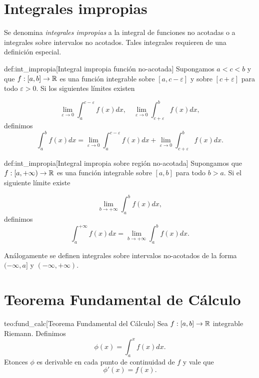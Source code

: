 \section{Integrales impropias}
Se denomina \emph{integrales impropias} a la integral de funciones no acotadas o a integrales sobre intervalos no acotados. Tales integrales requieren de una definición especial.
\begin{definicion}{def:int_impropia}[Integral impropia función no-acotada] Supongamos $a<c<b$ y que $f:[a,b]\to\mathbb{R}$ es una función integrable sobre $[a,c-\varepsilon]$ y sobre $[c+\varepsilon]$ para todo $\varepsilon>0$. Si los siguientes límites existen

\[
 \lim_{\varepsilon\to 0}\int_a^{c-\varepsilon}f(x)dx,\quad \lim_{\varepsilon\to 0}\int_{c+\varepsilon}^bf(x)dx,
\]
definimos 
\begin{equation}\label{eq:int_impro}
 \int_a^bf(x)dx= \lim_{\varepsilon\to 0}\int_a^{c-\varepsilon}f(x)dx+ \lim_{\varepsilon\to 0}\int_{c+\varepsilon}^bf(x)dx.
\end{equation}



 
\end{definicion}

\begin{definicion}{def:int_impropia}[Integral impropia sobre región no-acotada] Supongamos  que $f:[a,+\infty)\to\mathbb{R}$ es una función integrable sobre $[a,b]$  para todo $b>a$. Si el siguiente límite existe

\[
 \lim_{b\to +\infty}\int_a^bf(x)dx,
\]
definimos 
\begin{equation}\label{eq:int_impro_inf}
 \int_a^{+\infty}f(x)dx= \lim_{b\to +\infty}\int_a^bf(x)dx.
\end{equation}

\end{definicion}

Análogamente se definen integrales sobre intervalos no-acotados de la forma $(-\infty, a]$ y $(-\infty,+\infty)$.



\section{Teorema Fundamental de Cálculo}


\begin{teorema}{teo:fund_calc}[Teorema Fundamental del Cálculo]
 Sea $f:[a,b]\to\mathbb{R}$ integrable Riemann. Definimos
 \begin{equation*}\label{eq:primi1}
  \phi(x)=\int_a^{x}f(x)dx.
 \end{equation*}
Etonces $\phi$ es derivable en cada punto de continuidad de $f$ y vale que
 \begin{equation}\label{eq:primi2}
  \phi'(x)=f(x).
 \end{equation}
\end{teorema}


